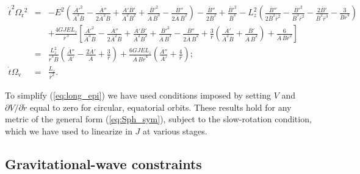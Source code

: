 \documentclass[aps,prd,amsfonts,amssymb,amsmath,nofootinbib,reprint,showpacs]{revtex4-1}
\newcommand{\eqnref}[1]{(\ref{eq:#1})}
\newcommand{\sub}[1]{\ensuremath{_\text{#1}}}
\begin{document}
\begin{widetext}
\begin{eqnarray}
\dot{t}^2\Omega\sub{r}^2 & = & -E^2 \left( \frac{\overline{A}'^2}{\overline{A}^3 \overline{B}} - \frac{\overline{A}''}{2\overline{A}^2\overline{B}} + \frac{\overline{A}'\overline{B}'}{\overline{A}^2\overline{B}^2} + \frac{\overline{B}'^2}{\overline{A}\,\overline{B}^3} - \frac{\overline{B}''}{2\overline{A}\,\overline{B}^2} \right) - \frac{\overline{B}''}{2\overline{B}^2} +  \frac{\overline{B}'^2}{\overline{B}^3} - L_z^2 \left(\frac{\overline{B}''}{2\overline{B}^2 \overline{r}^2} - \frac{\overline{B}'^2}{\overline{B}^3 \overline{r}^2} - \frac{2\overline{B}'}{\overline{B}^2 \overline{r}^3}-\frac{3}{\overline{B} \overline{r}^4} \right) \nonumber \\
& & + \frac{4GJEL_z}{\overline{r}^{\,3}} \left[ \frac{\overline{A}'^2}{\overline{A}^3 \overline{B}} - \frac{\overline{A}''}{2\overline{A}^2\overline{B}} + \frac{\overline{A}'\overline{B}'}{\overline{A}^2\overline{B}^2} + \frac{\overline{B}'^2}{\overline{A}\,\overline{B}^3} - \frac{\overline{B}''}{2\overline{A}\,\overline{B}^2} +\frac{3}{\overline{r}}\left(\frac{\overline{A}'}{\overline{A}^2\overline{B}}+\frac{\overline{B}'}{\overline{A}\,\overline{B}^2}\right) +\frac{6}{\overline{A}\,\overline{B}\overline{r}^2}\right] \label{eq:long_epi} \\
& = &  \frac{L_z^2}{\overline{r}^3\overline{B}}\left(\frac{\overline{A}''}{\overline{A}'} - \frac{2\overline{A}'}{\overline{A}} + \frac{3}{\overline{r}}\right) +\frac{6GJEL_z}{\overline{A}\,\overline{B} \overline{r}^4} \left(\frac{\overline{A}''}{\overline{A}'} + \frac{4}{\overline{r}}\right); \\
\dot{t}\Omega\sub{v} & = & \frac{L_z}{\overline{r}^2}.
\end{eqnarray}
\end{widetext}
To simplify \eqnref{long_epi} we have used conditions imposed by setting $V$ and $\partial V/\partial \widetilde{r}$ equal to zero for circular, equatorial orbits. These results hold for any metric of the general form \eqnref{Sph_sym}, subject to the slow-rotation condition, which we have used to linearize in $J$ at various stages.

\subsection{Gravitational-wave constraints}
\end{document}
